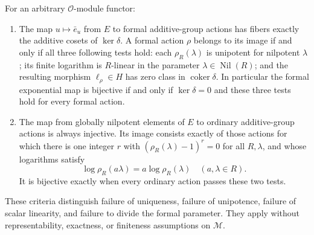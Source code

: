 \begin{theorem}
\label{C:functor-criterion}
For an arbitrary $\mathcal O$-module functor:
\begin{enumerate}
\item The map $u\mapsto\bar e_u$ from $E$ to formal additive-group actions has fibers exactly the additive cosets of $\ker\delta$. A formal action $\rho$ belongs to its image if and only if all three following tests hold: each $\rho_R(\lambda)$ is unipotent for nilpotent $\lambda$; its finite logarithm is $R$-linear in the parameter $\lambda\in\operatorname{Nil}(R)$; and the resulting morphism $\ell_\rho\in H$ has zero class in $\operatorname{coker}\delta$. In particular the formal exponential map is bijective if and only if $\ker\delta=0$ and these three tests hold for every formal action.
\item The map from globally nilpotent elements of $E$ to ordinary additive-group actions is always injective. Its image consists exactly of those actions for which there is one integer $r$ with $(\rho_R(\lambda)-1)^r=0$ for all $R,\lambda$, and whose logarithms satisfy
\[
\log\rho_R(a\lambda)=a\log\rho_R(\lambda)
\quad(a,\lambda\in R).
\]
It is bijective exactly when every ordinary action passes these two tests.
\end{enumerate}
These criteria distinguish failure of uniqueness, failure of unipotence, failure of scalar linearity, and failure to divide the formal parameter. They apply without representability, exactness, or finiteness assumptions on $\mathcal M$.
\end{theorem}
